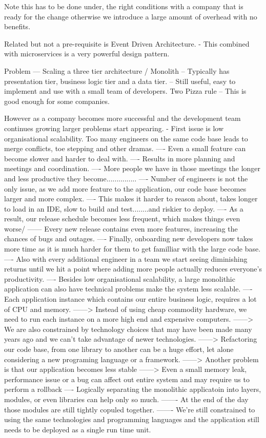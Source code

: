 \documentclass[a4paper, 11pt]{book}
\begin{document}
{    Note this has to be done under, the right conditions with a company that is ready for the change otherwise we introduce a large amount of overhead with no benefits.

    Related but not a pre-requisite is Event Driven Architecture.
    - This combined with microservices is a very powerful design pattern.

    Problem --- Scaling a three tier architecture / Monolith
    -- Typically has presentation tier, business logic tier and a data tier.
    -- Still useful, easy to implement and use with a small team of developers. Two Pizza rule %
    -- This is good enough for some companies.

    However as a company becomes more successful and the development team continues growing larger problems start appearing.
    - First issue is low organisational scalability. Too many engineers on the same code base leads to merge conflicts, toe stepping and other dramas.
    ---- Even a small feature can become slower and harder to deal with.
    ---- Results in more planning and meetings and coordination.
    ---- More people we have in those meetings the longer and less productive they become...............
    ---- Number of engineers is not the only issue, as we add more feature to the application, our code base becomes larger and more complex.
    ---- This makes it harder to reason about, takes longer to load in an IDE, slow to build and test........and riskier to deploy.
    ---- As a result, our release schedule becomes less frequent, which makes things even worse/
    ------ Every new release contains even more features, increasing the chances of bugs and outages.
    ---- Finally, onboarding new developers now takes more time as it is much harder for them to get familliar with the large code base.
    ---- Also with every additional engineer in a team we start seeing diminishing returns until we hit a point where adding more people actually reduces everyone's productivity.
    ---- Besides low organisational scalability, a large monolithic application can also have technical problems make the system less scalable.
    ---- Each application instance which contains our entire business logic, requires a lot of CPU and memory.
    ------> Instead of using cheap commodity hardware, we need to run each instance on a more high end and expensive computers.
    ------> We are also constrained by technology choices that may have been made many years ago and we can't take advantage of newer technologies.
    ------> Refactoring our code base, from one library to another can be a huge effort, let alone considering a new programing language or a framework.
    ------> Another problem is that our application becomes less stable
    ------> Even a small memory leak, performance issue or a bug can affect out entire system and may require us to perform a rollback
    ---- Logically separating the monolithic applicatoin into layers, modules, or even libraries can help only so much.
    ------- At the end of the day those modules are still tightly copuled together.
    ------- We're still constrained to using the same technologies and programming languages and the application still needs to be deployed as a single run time unit.

}
\end{document}
